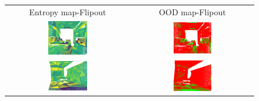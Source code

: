         \begin{figure}[h!]
            \centering
            \begin{tabular}{cc}
                Entropy map-Flipout & OOD map-Flipout \\
                \includegraphics[width=0.33\textwidth, height=0.18\textheight]{images/ood_imgs/fout_s3dis/ofc_3_fout_ent.png}& 
                \includegraphics[width=0.33\textwidth, height=0.18\textheight]{images/ood_imgs/fout_s3dis/fout_ent_2.png}\\
    
                \includegraphics[width=0.33\textwidth, height=0.18\textheight]{images/ood_imgs/fout_s3dis/cf1_fout_ent.png}& 
                \includegraphics[width=0.33\textwidth, height=0.18\textheight]{images/ood_imgs/fout_s3dis/fout_ent_4.png}\\
    

\end{tabular}
\end{figure}

